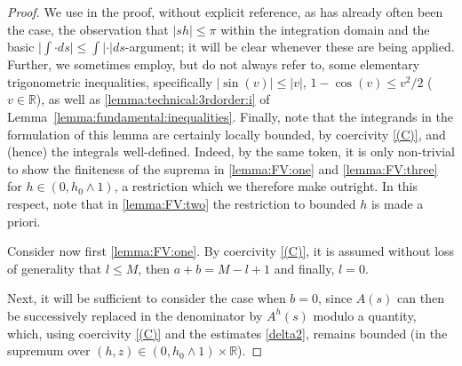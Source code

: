 \documentclass[pdftex,oneside,11pt,reqno]{amsart}
\theoremstyle{definition}
\theoremstyle{theorem}
\theoremstyle{remark}
\numberwithin{equation}{section}
\numberwithin{definition}{section}
\begin{document}
\begin{proof}
We use in the proof, without explicit reference, as has already often been the case, the observation that  $\vert sh\vert\leq\pi$ within the integration domain and the basic $\vert \int\cdot ds\vert\leq\int\vert\cdot\vert ds$-argument; it will be clear whenever these are being applied. Further, we sometimes employ, but do not always refer to, some elementary trigonometric inequalities, specifically $\vert \sin(v)\vert\leq \vert v\vert$, $1-\cos(v)\leq v^2/2$ ($v\in \mathbb{R}$), as well as \ref{lemma:technical:3rdorder:i} of Lemma~\ref{lemma:fundamental:inequalities}. 
Finally, note that the integrands in the formulation of this lemma are certainly locally bounded, by coercivity \ref{(C)}, and (hence) the integrals well-defined. Indeed, by the same token, it is only non-trivial to show the finiteness of the suprema in \eqref{lemma:FV:one} and \eqref{lemma:FV:three} for $h\in (0,h_0\land 1)$, a restriction which we therefore make outright. In this respect, note that in \eqref{lemma:FV:two} the restriction to bounded $h$ is made a priori.

Consider now first \eqref{lemma:FV:one}. By coercivity \ref{(C)}, it is assumed without loss of generality that $l\leq M$, then $a+b=M-l+1$ and finally, $l=0$. 

Next, it will be sufficient to consider the case when $b=0$, since $A(s)$ can then be successively replaced in the denominator by $A^h(s)$ modulo a quantity, which, using coercivity \ref{(C)} and the estimates \ref{delta2}, remains bounded (in the supremum over $(h,z)\in (0,h_0\land 1)\times \mathbb{R}$). 


\end{proof}
\end{document}
